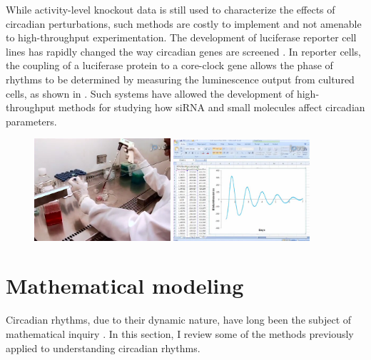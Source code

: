 While activity-level knockout data is still used to characterize the effects of circadian perturbations, such methods are costly to implement and not amenable to high-throughput experimentation.
The development of luciferase reporter cell lines has rapidly changed the way circadian genes are screened \cite{Yoo2004}.
In reporter cells, the coupling of a luciferase protein to a core-clock gene allows the phase of rhythms to be determined by measuring the luminescence output from cultured cells, as shown in .
Such systems have allowed the development of high-throughput methods for studying how siRNA \cite{Zhang2009} and small molecules \cite{Hirota2008} affect circadian parameters.

\begin{figure}[tbp]
  \centering
  \includegraphics[width=0.45\textwidth]{chap1/figures/cells.png}
  \includegraphics[width=0.45\textwidth]{chap1/figures/data.png}
  \label{fig:chidalumin}
\end{figure}

\section{Mathematical modeling}

Circadian rhythms, due to their dynamic nature, have long been the subject of mathematical inquiry \cite{Winfree2001}. In this section, I review some of the methods previously applied to understanding circadian rhythms.


